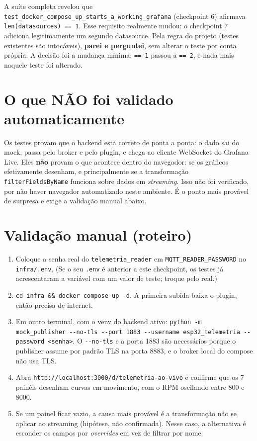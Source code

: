 \documentclass[11pt,a4paper]{article}
\begin{document}
A suíte completa revelou que \texttt{test\_docker\_compose\_up\_starts\_a\_working\_grafana} (checkpoint 6) afirmava \texttt{len(datasources) == 1}. Esse requisito realmente mudou: o checkpoint 7 adiciona legitimamente um segundo datasource. Pela regra do projeto (testes existentes são intocáveis), \textbf{parei e perguntei}, sem alterar o teste por conta própria. A decisão foi a mudança mínima: \texttt{== 1} passou a \texttt{== 2}, e nada mais naquele teste foi alterado.

\section{O que NÃO foi validado automaticamente}

Os testes provam que o backend está correto de ponta a ponta: o dado sai do mock, passa pelo broker e pelo plugin, e chega ao cliente WebSocket do Grafana Live. Eles \textbf{não} provam o que acontece dentro do navegador: se os gráficos efetivamente desenham, e principalmente se a transformação \texttt{filterFieldsByName} funciona sobre dados em \emph{streaming}. Isso não foi verificado, por não haver navegador automatizado neste ambiente. É o ponto mais provável de surpresa e exige a validação manual abaixo.

\section{Validação manual (roteiro)}

\begin{enumerate}
    \item Coloque a senha real do \texttt{telemetria\_reader} em \texttt{MQTT\_READER\_PASSWORD} no \texttt{infra/.env}. (Se o seu \texttt{.env} é anterior a este checkpoint, os testes já acrescentaram a variável com um valor de teste; troque pelo real.)
    \item \texttt{cd infra \&\& docker compose up -d}. A primeira subida baixa o plugin, então precisa de internet.
    \item Em outro terminal, com o venv do backend ativo: \texttt{python -m mock\_publisher -{}-no-tls -{}-port 1883 -{}-username esp32\_telemetria -{}-password <senha>}. O \texttt{-{}-no-tls} e a porta 1883 são necessários porque o publisher assume por padrão TLS na porta 8883, e o broker local do compose não usa TLS.
    \item Abra \texttt{http://localhost:3000/d/telemetria-ao-vivo} e confirme que os 7 painéis desenham curvas em movimento, com o RPM oscilando entre 800 e 8000.
    \item Se um painel ficar vazio, a causa mais provável é a transformação não se aplicar ao streaming (hipótese, não confirmada). Nesse caso, a alternativa é esconder os campos por \emph{overrides} em vez de filtrar por nome.
\end{enumerate}
\end{document}
